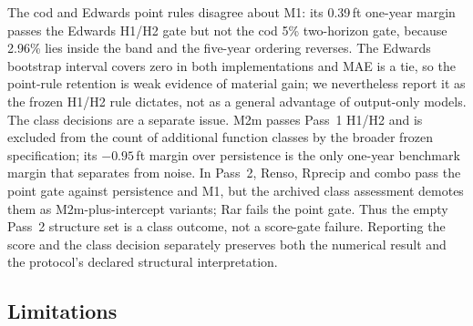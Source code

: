 \documentclass[preprint,11pt,authoryear]{elsarticle}
\theoremstyle{definition}
\theoremstyle{remark}
\begin{document}
The cod and Edwards point rules disagree about M1: its 0.39\,ft one-year margin passes the Edwards H1/H2 gate but not the cod 5\% two-horizon gate, because 2.96\% lies inside the band and the five-year ordering reverses. The Edwards bootstrap interval covers zero in both implementations and MAE is a tie, so the point-rule retention is weak evidence of material gain; we nevertheless report it as the frozen H1/H2 rule dictates, not as a general advantage of output-only models. The class decisions are a separate issue. M2m passes Pass~1 H1/H2 and is excluded from the count of additional function classes by the broader frozen specification; its $-0.95$\,ft margin over persistence is the only one-year benchmark margin that separates from noise. In Pass~2, Renso, Rprecip and combo pass the point gate against persistence and M1, but the archived class assessment demotes them as M2m-plus-intercept variants; Rar fails the point gate. Thus the empty Pass~2 structure set is a class outcome, not a score-gate failure. Reporting the score and the class decision separately preserves both the numerical result and the protocol's declared structural interpretation.

\subsection{Limitations}\label{sec:limits}
\end{document}
